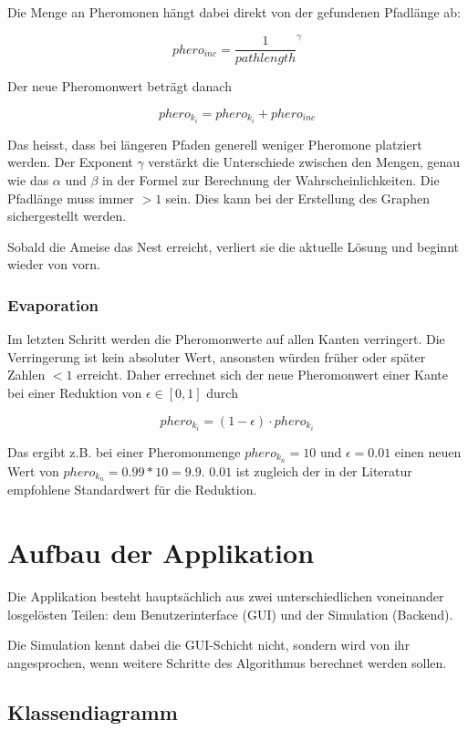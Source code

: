 Die Menge an Pheromonen hängt dabei direkt von der gefundenen Pfadlänge ab:

\[ phero_{inc} = {\frac{1}{pathlength}}^\gamma \]

Der neue Pheromonwert beträgt danach 

\[ phero_{k_i} = phero_{k_i} + phero_{inc} \]

Das heisst, dass bei längeren Pfaden generell weniger Pheromone platziert werden. Der Exponent $\gamma$ verstärkt die Unterschiede zwischen den Mengen, genau wie das $\alpha$ und $\beta$ in der Formel zur Berechnung der Wahrscheinlichkeiten. Die Pfadlänge muss immer $> 1$ sein. Dies kann bei der Erstellung des Graphen sichergestellt werden.

Sobald die Ameise das Nest erreicht, verliert sie die aktuelle Lösung und beginnt wieder von vorn.

\subsubsection*{Evaporation}

Im letzten Schritt werden die Pheromonwerte auf allen Kanten verringert. Die Verringerung ist kein absoluter Wert, ansonsten würden früher oder später Zahlen $< 1$ erreicht. Daher errechnet sich der neue Pheromonwert einer Kante bei einer Reduktion von $\epsilon \in [0, 1]$ durch

\[ phero_{k_i} = (1 - \epsilon) \cdot phero_{k_i} \]

Das ergibt z.B. bei einer Pheromonmenge $phero_{k_n} = 10$ und $\epsilon = 0.01$ einen neuen Wert von $phero_{k_n} = 0.99 * 10 = 9.9$. $0.01$ ist zugleich der in der Literatur empfohlene Standardwert für die Reduktion.

\section{Aufbau der Applikation}

Die Applikation besteht hauptsächlich aus zwei unterschiedlichen voneinander losgelösten Teilen: dem Benutzerinterface (GUI) und der Simulation (Backend).

Die Simulation kennt dabei die GUI-Schicht nicht, sondern wird von ihr angesprochen, wenn weitere Schritte des Algorithmus berechnet werden sollen.

\subsection{Klassendiagramm}



